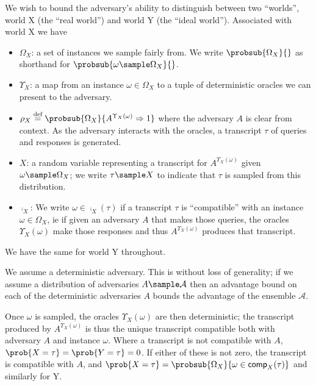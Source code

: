 \documentclass[eprint.tex]{subfiles}
\begin{document}
We wish to bound the adversary's ability to distinguish between
two ``worlds'', world X (the ``real world'') and world Y (the ``ideal world'').
Associated with world X we have
\begin{itemize}
    \item $\Omega_X$: a set of instances we sample fairly from. We write
    $\probsub{\Omega_X}{}$ as shorthand for $\probsub{\omega \sample \Omega_X}{}$.
    \item $\Upsilon_X$: a map from an instance $\omega \in \Omega_X$ to a tuple of
    deterministic oracles we can present to the adversary.
    \item $\rho_X \defeq \probsub{\Omega_X}{A^{\Upsilon_X(\omega)} \Rightarrow 1}$\label{rhox}
    where the adversary $A$ is clear from context.
    As the adversary interacts with the oracles, a transcript $\tau$
    of queries and responses is generated.
    \item $X$: a random variable representing a transcript for $A^{\Upsilon_X(\omega)}$
    given $\omega \sample \Omega_X$; we write $\tau \sample X$
    to indicate that $\tau$ is sampled from this distribution.
    \item $\comp_X$:  We write $\omega \in \comp_X(\tau)$
    if a transcript $\tau$ is ``compatible'' with an instance $\omega \in \Omega_X$,
    ie if given an adversary $A$ that makes those queries, the oracles $\Upsilon_X(\omega)$
    make those responses and thus $A^{\Upsilon_X(\omega)}$ produces that transcript.
\end{itemize}
We have the same for world Y throughout.

We assume a deterministic adversary. This is without loss of
generality; if we assume a distribution of adversaries $A \sample \mathcal{A}$
then an advantage bound on each of the deterministic adversaries $A$ bounds the advantage
of the ensemble $\mathcal{A}$.

Once $\omega$ is sampled, the oracles $\Upsilon_X(\omega)$ are then deterministic;
the transcript produced by $A^{\Upsilon_X(\omega)}$ is thus the unique transcript
compatible both with adversary $A$ and instance $\omega$. Where a transcript
is not compatible with $A$, $\prob{X = \tau} = \prob{Y = \tau} = 0$. If either
of these is not zero, the transcript is compatible with $A$, and
$\prob{X = \tau} = \probsub{\Omega_X}{\omega \in \comp_X(\tau)}$ and similarly for Y.
\end{document}
